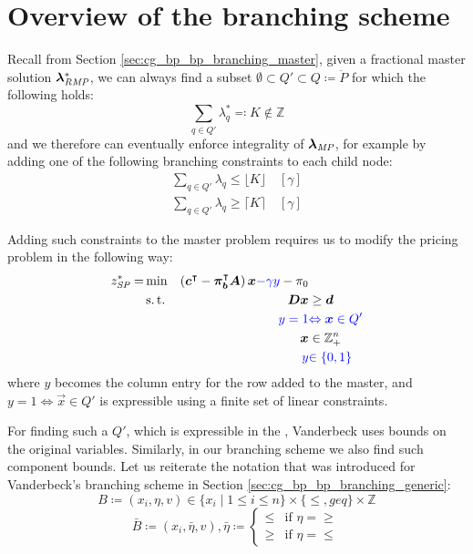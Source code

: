 \section{Overview of the branching scheme}\label{sec:cmpbnd_overview}
Recall from Section \ref{sec:cg_bp_bp_branching_master}, given a fractional master solution ${\bm{\lambda}}^*_{\textit{RMP}}{}$, we can always find a subset $\emptyset \subset Q' \subset Q \coloneqq \ddot{P}$ for which the following holds:
\begin{equation}\label{eq:compbnd_branching_master}
\sum_{q \in Q'} \lambda_q^* \eqqcolon K \not\in \mathbb{Z}
\end{equation}
and we therefore can eventually enforce integrality of ${\bm{\lambda}}_{\textit{MP}}{}$, for example by adding one of the following branching constraints to each child node:
\begin{equation}
\begin{aligned}
\sum_{q \in Q'} \lambda_q \leq \lfloor K \rfloor \quad \left[\gamma\right] \\
\sum_{q \in Q'} \lambda_q \geq \lceil K \rceil \quad \left[\gamma\right]
\end{aligned}
\end{equation}

Adding such constraints to the master problem requires us to modify the pricing problem in the following way:
\begin{equation}
\begin{aligned}
z^*_\SP{} = &\min & \left( \vec{c}\transpose - \vec{\pi}_\vec{b}\transpose \mat{A} \right) \vec{x} {\color{blue} - \gamma y} - \pi_0 & \\
&\st & \mat{D} \vec{x} & \geq \vec{d} \\
&& {\color{blue} y = 1} & {\color{blue} \Leftrightarrow \vec{x} \in Q'} \\
&& \vec{x} & \in \mathbb{Z}_+^n \\
&& {\color{blue} y} & {\color{blue} \in \{0, 1\}}
\end{aligned}
\end{equation}
where $y$ becomes the column entry for the row added to the master, and $y = 1 \Leftrightarrow \vec{x} \in Q'$ is expressible using a finite set of linear constraints.

For finding such a $Q'$, which is expressible in the \SP{}, Vanderbeck uses bounds on the original variables. Similarly, in our branching scheme we also find such component bounds. Let us reiterate the notation that was introduced for Vanderbeck's branching scheme in Section \ref{sec:cg_bp_bp_branching_generic}:
\begin{equation}
B \coloneqq \left( x_i, \eta, v \right) \in \{x_i \mid 1 \leq i \leq n\} \times \{\leq, geq\} \times \mathbb{Z}
\end{equation}
\begin{equation}
\bar{B} \coloneqq \left( x_i, \bar{\eta}, v \right), \bar{\eta} \coloneqq \begin{cases} \leq & \text{if } \eta = \geq \\ \geq & \text{if } \eta = \leq \end{cases}
\end{equation}

